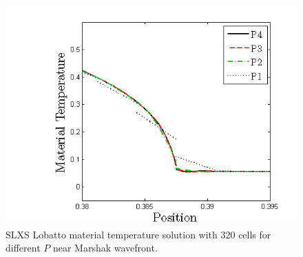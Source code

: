 \begin{figure}[!htp]
\centering
\includegraphics[width=12cm]{chapter6_grey_radtran/Dissertation_Data/Pointless_Marshak_Zoom_Temperature_Lobatto_P_Refinement.png}
\caption{SLXS Lobatto material temperature solution with 320 cells for different $P$ near Marshak wavefront.}
\label{fig:p_convergence_temp}
\end{figure}

